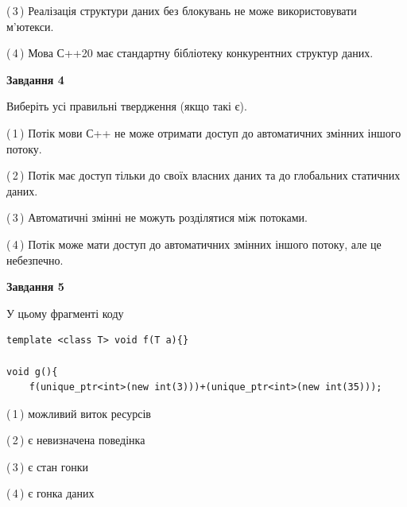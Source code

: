 \documentclass[12pt, ukrainian]{article}
\begin{document}
\begin {large}
{(\,3\,) Реалізація структури даних без блокувань не може використовувати м’ютекси.%

(\,4\,) Мова С++20 має стандартну бібліотеку конкурентних структур даних.%



\begin{center}
\textbf{Завдання 4}
\end{center}
Виберіть усі правильні твердження (якщо такі є).\par
\vspace{2mm}

(\,1\,) Потік мови С++ не може отримати доступ до автоматичних змінних іншого потоку.%

(\,2\,) Потік має доступ тільки до своїх власних даних та до глобальних статичних даних.%

(\,3\,) Автоматичні змінні не можуть розділятися між потоками.%

(\,4\,) Потік може мати доступ до автоматичних змінних іншого потоку, але це небезпечно.%



\begin{center}
\textbf{Завдання 5}
\end{center}
У цьому фрагменті коду
\begin{verbatim}
template <class T> void f(T a){}

void g(){
    f(unique_ptr<int>(new int(3)))+(unique_ptr<int>(new int(35)));
\end{verbatim}

(\,1\,) можливий виток ресурсів%

(\,2\,) є невизначена поведінка%

(\,3\,) є стан гонки%

(\,4\,) є гонка даних%


}
\end {large}
\end{document}

